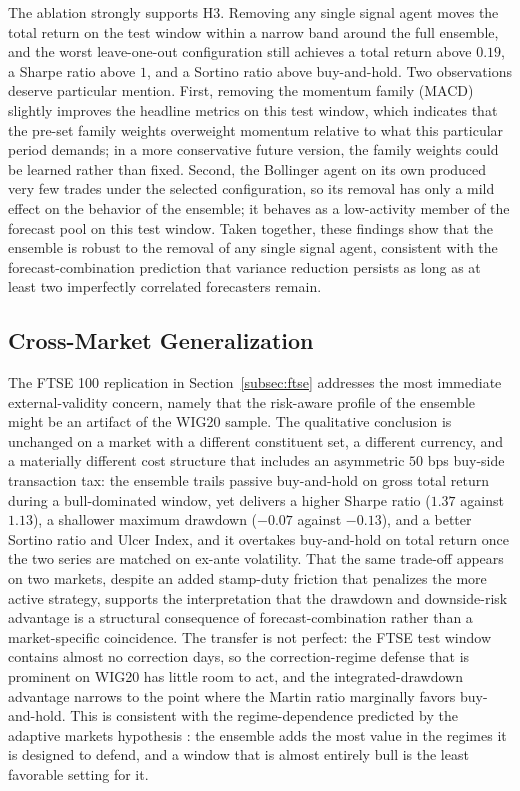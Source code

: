 \documentclass{ieeeaccess}
\newcommand{\FtseMDD}{\ensuremath{-0.07}}
\newcommand{\FtseSharpe}{\ensuremath{1.37}}
\newcommand{\FtseBHmdd}{\ensuremath{-0.13}}
\newcommand{\FtseBHsharpe}{\ensuremath{1.13}}
\begin{document}
The ablation strongly supports H3. Removing any single signal agent moves the total return on the test window within a narrow band around the full ensemble, and the worst leave-one-out configuration still achieves a total return above $0.19$, a Sharpe ratio above $1$, and a Sortino ratio above buy-and-hold. Two observations deserve particular mention. First, removing the momentum family (MACD) slightly improves the headline metrics on this test window, which indicates that the pre-set family weights overweight momentum relative to what this particular period demands; in a more conservative future version, the family weights could be learned rather than fixed. Second, the Bollinger agent on its own produced very few trades under the selected configuration, so its removal has only a mild effect on the behavior of the ensemble; it behaves as a low-activity member of the forecast pool on this test window. Taken together, these findings show that the ensemble is robust to the removal of any single signal agent, consistent with the forecast-combination prediction that variance reduction persists as long as at least two imperfectly correlated forecasters remain.

\subsection{Cross-Market Generalization}
\label{subsec:crossmarket}

The FTSE 100 replication in Section~\ref{subsec:ftse} addresses the most immediate external-validity concern, namely that the risk-aware profile of the ensemble might be an artifact of the WIG20 sample. The qualitative conclusion is unchanged on a market with a different constituent set, a different currency, and a materially different cost structure that includes an asymmetric $50$ bps buy-side transaction tax: the ensemble trails passive buy-and-hold on gross total return during a bull-dominated window, yet delivers a higher Sharpe ratio (\FtseSharpe{} against \FtseBHsharpe{}), a shallower maximum drawdown (\FtseMDD{} against \FtseBHmdd{}), and a better Sortino ratio and Ulcer Index, and it overtakes buy-and-hold on total return once the two series are matched on ex-ante volatility. That the same trade-off appears on two markets, despite an added stamp-duty friction that penalizes the more active strategy, supports the interpretation that the drawdown and downside-risk advantage is a structural consequence of forecast-combination rather than a market-specific coincidence. The transfer is not perfect: the FTSE test window contains almost no correction days, so the correction-regime defense that is prominent on WIG20 has little room to act, and the integrated-drawdown advantage narrows to the point where the Martin ratio marginally favors buy-and-hold. This is consistent with the regime-dependence predicted by the adaptive markets hypothesis \cite{lo2004}: the ensemble adds the most value in the regimes it is designed to defend, and a window that is almost entirely bull is the least favorable setting for it.
\end{document}
